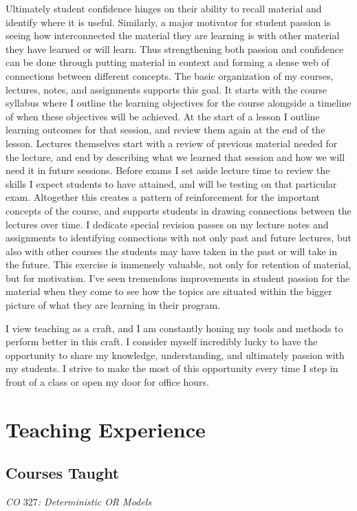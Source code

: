 \documentclass{article}
\begin{document}
Ultimately student confidence hinges on their ability to recall material and identify where it is useful. Similarly, a major motivator for student passion is seeing how interconnected the material they are learning is with other material they have learned or will learn. Thus strengthening both passion and confidence can be done through putting material in context and forming a dense web of connections between different concepts. The basic organization of my courses, lectures, notes, and assignments supports this goal. It starts with the course syllabus where I outline the learning objectives for the course alongside a timeline of when these objectives will be achieved. At the start of a lesson I outline learning outcomes for that session, and review them again at the end of the lesson. Lectures themselves start with a review of previous material needed for the lecture, and end by describing what we learned that session and how we will need it in future sessions. Before exams I set aside lecture time to review the skills I expect students to have attained, and will be testing on that particular exam. Altogether this creates a pattern of reinforcement for the important concepts of the course, and supports students in drawing connections between the lectures over time. I dedicate special revision passes on my lecture notes and assignments to identifying connections with not only past and future lectures, but also with other courses the students may have taken in the past or will take in the future. This exercise is immensely valuable, not only for retention of material, but for motivation. I've seen tremendous improvements in student passion for the material when they come to see how the topics are situated within the bigger picture of what they are learning in their program.

I view teaching as a craft, and I am constantly honing my tools and methods to perform better in this craft. I consider myself incredibly lucky to have the opportunity to share my knowledge, understanding, and ultimately passion with my students. I strive to make the most of this opportunity every time I step in front of a class or open my door for office hours.

\section{Teaching Experience}

\subsection{Courses Taught}
\emph{CO $327$: Deterministic OR Models}
\end{document}
